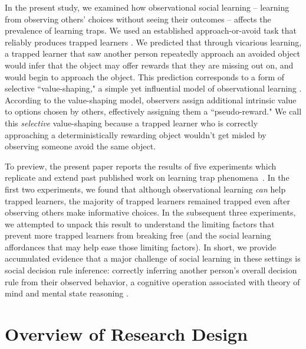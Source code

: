 \documentclass[11pt]{article} %
\begin{document}
In the present study, we examined how observational social learning -- learning from observing others' choices without seeing their outcomes -- affects the prevalence of learning traps. We used an established approach-or-avoid task that reliably produces trapped learners \cite{richLimitsLearningExploration2018}. We predicted that through vicarious learning, a trapped learner that saw another person repeatedly approach an avoided object would infer that the object may offer rewards that they are missing out on, and would begin to approach the object.  This prediction corresponds to a form of selective ``value-shaping," a simple yet influential model of observational learning \cite{schultnerTransmissionSocialBias2024, najarActionsOthersAct2020}. According to the value-shaping model, observers assign additional intrinsic value to options chosen by others, effectively assigning them a ``pseudo-reward." We call this \emph{selective} value-shaping because a trapped learner who is correctly approaching a deterministically rewarding object wouldn't get misled by observing someone avoid the same object. 

To preview, the present paper reports the results of five experiments which replicate and extend past published work on learning trap phenomena~\cite{richLimitsLearningExploration2018, liCanLossesHelp2021, allidinaAvoidanceBegetsAvoidance2021, liquinChildrenAreMore2022}. In the first two experiments, we found that although observational learning \emph{can} help trapped learners, the majority of trapped learners remained trapped even after observing others make informative choices. In the subsequent three experiments, we attempted to unpack this result to understand the limiting factors that prevent more trapped learners from breaking free (and the social learning affordances that may help ease those limiting factors). In short, we provide accumulated evidence that a major challenge of social learning in these settings is social decision rule inference: correctly inferring another person's overall decision rule from their observed behavior, a cognitive operation associated with theory of mind and mental state reasoning \cite{bakerActionUnderstandingInverse2009, jara-ettingerTheoryMindInverse2019}.

\section{Overview of Research Design}
\end{document}
